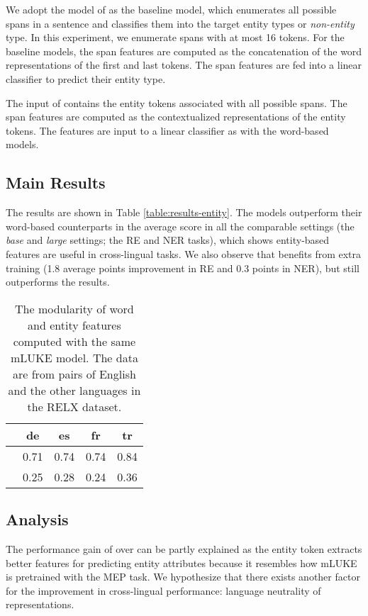 \documentclass[11pt]{article}
\newcommand{\minisection}[1]{\noindent{\bf {#1}.}}
\begin{document}
\minisection{Models}
We adopt the model of \citet{Sohrab2018DeepRecognition} as the baseline model, which enumerates all possible spans in a sentence and classifies them into the target entity types or {\it non-entity} type. In this experiment, we enumerate spans with at most 16 tokens.
For the baseline models, the span features are computed as the concatenation of the word representations of the first and last tokens.
The span features are fed into a linear classifier to predict their entity type.

The input of \mlukeE{} contains the entity \mask{} tokens associated with all possible spans.
The span features are computed as the contextualized representations of the entity \mask{} tokens.
The features are input to a linear classifier as with the word-based models.

\subsection{Main Results}
The results are shown in Table \ref{table:results-entity}.
The \mlukeE{} models outperform their word-based counterparts \mlukeW{} in the average score in all the comparable settings (the {\it base} and {\it large} settings; the RE and NER tasks), which shows entity-based features are useful in cross-lingual tasks.
We also observe that \xlmr{}\ba{} benefits from extra training (1.8 average points improvement in RE and 0.3 points in NER), but \mlukeE{} still outperforms the results.

\begin{table}[ht]
  \centering
  \begin{tabular}{lcccc} \toprule
            & de   & es   & fr   & tr   \\ \midrule
  \mlukeW{}\ba{} & 0.71 & 0.74 & 0.74 & 0.84 \\
  \mlukeE{}\ba{} & 0.25 & 0.28 & 0.24 & 0.36 \\ \bottomrule
  \end{tabular}
  \caption{The modularity of word and entity features computed with the same mLUKE model. The data are from pairs of English and the other languages in the RELX dataset.}
  \label{table:modularity}
\end{table}

\subsection{Analysis}
The performance gain of \mlukeE{} over \mlukeW{} can be partly explained as the entity \mask{} token extracts better features for predicting entity attributes because it resembles how mLUKE is pretrained with the MEP task.
We hypothesize that there exists another factor for the improvement in cross-lingual performance: language neutrality of representations.
\end{document}
